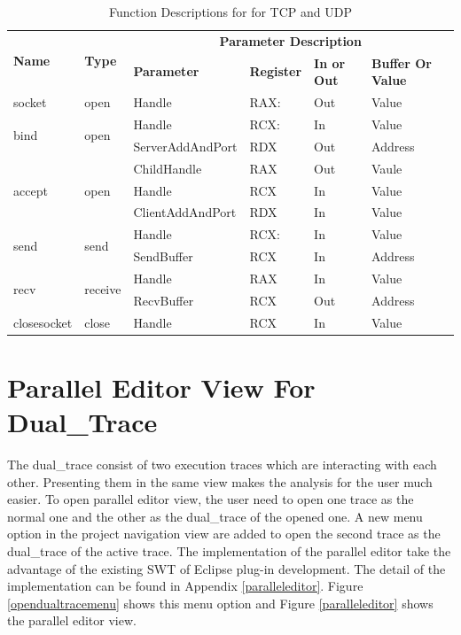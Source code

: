 \begin{table}[H]
  \centering
  \caption{Function Descriptions for for TCP and UDP}
  \label{tcpupdfunctions}
  \begin{tabular}{|l|l|l|l|l|l|}
    \hline
     \multirow{2}{*}{{\textbf{Name}}} & \multirow{2}{*}{{\textbf{Type}}} & \multicolumn{4}{c|}{\textbf{Parameter Description}}  \\
      \cline{3-6} 
     & & \textbf{Parameter}& \textbf{Register}& \textbf{In or Out} &  \textbf{Buffer Or Value}  \\
     \hline
     socket & open &  Handle & RAX: & Out & Value\\
    \hline   
    \multirow{2}{*}{bind}
    &\multirow{2}{*}{open} &  Handle & RCX: & In & Value\\
     \cline{3-6} 
    & & ServerAddAndPort & RDX & Out & Address\\
   \hline 
   \multirow{3}{*}{accept}
   &\multirow{3}{*}{open} &  ChildHandle & RAX & Out & Vaule\\
    \cline{3-6} 
   & & Handle & RCX & In & Value\\
   \cline{3-6} 
   & & ClientAddAndPort & RDX & In & Value\\
  \hline 
  \multirow{2}{*}{send}
  &\multirow{2}{*}{send} &  Handle & RCX: & In & Value\\
   \cline{3-6} 
  & & SendBuffer & RCX & In & Address\\
 \hline       
    \multirow{2}{*}{recv}
     &\multirow{2}{*}{receive} &  Handle & RAX & In & Value\\
      \cline{3-6} 
     & & RecvBuffer & RCX & Out & Address\\
    \hline                        
     closesocket &
      close &  Handle & RCX & In & Value\\
    \hline               
\end{tabular}
\end{table}

\section{Parallel Editor View For Dual\_Trace}
The dual\_trace consist of two execution traces which are interacting with each other. Presenting them in the same view makes the analysis for the user much easier. To open parallel editor view, the user need to open one trace as the normal one and the other as the dual\_trace of the opened one. A new menu option in the project navigation view are added to open the second trace as the dual\_trace of the active trace. The implementation of the parallel editor take the advantage of the existing SWT of Eclipse plug-in development. The detail of the implementation can be found in Appendix \ref{paralleleditor}. Figure \ref{opendualtracemenu} shows this menu option and Figure \ref{paralleleditor} shows the parallel editor view.

